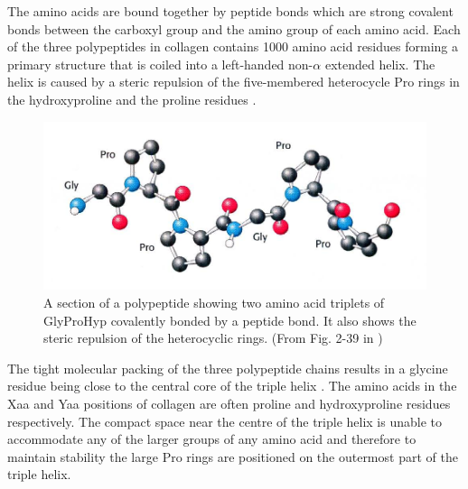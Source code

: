 The amino acids are bound together by peptide bonds which are strong covalent bonds between the carboxyl group and the amino group of each amino acid. Each of the three polypeptides in collagen contains 1000 amino acid residues forming a primary structure that is coiled into a left-handed non-$\alpha$ extended helix. The helix is caused by a steric repulsion of the five-membered heterocycle Pro rings in the hydroxyproline and the proline residues \cite{Shoulders2009,Bhattacharjee2005}. 

\begin{figure}[htp]
\centering \includegraphics[scale=0.3]{Graphics/Collagen/polypeptide_section_freeman.png}
\caption{A section of a polypeptide showing two amino acid triplets of GlyProHyp covalently bonded by a peptide bond. It also shows the steric repulsion of the heterocyclic rings. (From Fig. 2-39 in \cite{Berg2010})}
\label{fig:col_polyp_sec}
\end{figure}

The tight molecular packing of the three polypeptide chains results in a glycine residue being close to the central core of the triple helix \cite{Shoulders2009,Bhattacharjee2005,Berg2010}. The amino acids in the Xaa and Yaa positions of collagen are often proline and hydroxyproline residues respectively. The compact space near the centre of the triple helix is unable to accommodate any of the larger groups of any amino acid and therefore to maintain stability the large Pro rings are positioned on the outermost part of the triple helix.
  
